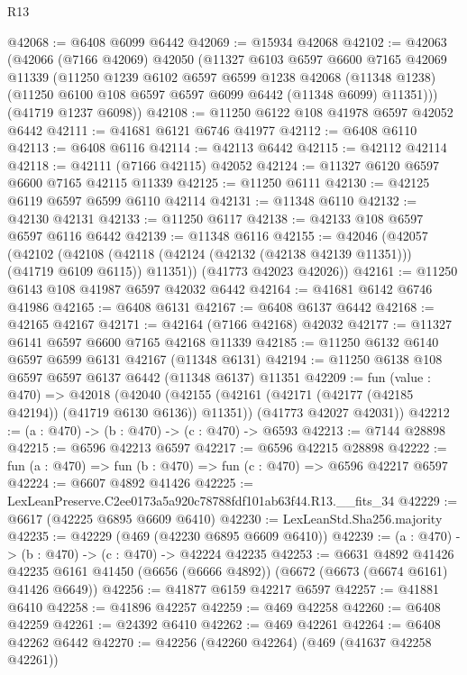 \begin{lexlean}{R13}
\begin{coremodule}
@42068 := @6408 @6099 @6442
@42069 := @15934 @42068
@42102 := @42063
    (@42066
      (@7166 @42069)
      @42050
      (@11327
        @6103
        @6597
        @6600
        @7165
        @42069
        @11339
        (@11250
          @1239
          @6102
          @6597
          @6599
          @1238
          @42068
          (@11348 @1238)
          (@11250 @6100 @108 @6597 @6597 @6099 @6442 (@11348 @6099) @11351)))
      (@41719 @1237 @6098))
@42108 := @11250 @6122 @108 @41978 @6597 @42052 @6442
@42111 := @41681 @6121 @6746 @41977
@42112 := @6408 @6110
@42113 := @6408 @6116
@42114 := @42113 @6442
@42115 := @42112 @42114
@42118 := @42111 (@7166 @42115) @42052
@42124 := @11327 @6120 @6597 @6600 @7165 @42115 @11339
@42125 := @11250 @6111
@42130 := @42125 @6119 @6597 @6599 @6110 @42114
@42131 := @11348 @6110
@42132 := @42130 @42131
@42133 := @11250 @6117
@42138 := @42133 @108 @6597 @6597 @6116 @6442
@42139 := @11348 @6116
@42155 := @42046
    (@42057
      (@42102
        (@42108 (@42118 (@42124 (@42132 (@42138 @42139 @11351))) (@41719 @6109 @6115)) @11351))
      (@41773 @42023 @42026))
@42161 := @11250 @6143 @108 @41987 @6597 @42032 @6442
@42164 := @41681 @6142 @6746 @41986
@42165 := @6408 @6131
@42167 := @6408 @6137 @6442
@42168 := @42165 @42167
@42171 := @42164 (@7166 @42168) @42032
@42177 := @11327 @6141 @6597 @6600 @7165 @42168 @11339
@42185 := @11250 @6132 @6140 @6597 @6599 @6131 @42167 (@11348 @6131)
@42194 := @11250 @6138 @108 @6597 @6597 @6137 @6442 (@11348 @6137) @11351
@42209 := fun (value : @470) =>
  @42018
    (@42040
      (@42155 (@42161 (@42171 (@42177 (@42185 @42194)) (@41719 @6130 @6136)) @11351))
      (@41773 @42027 @42031))
@42212 := (a : @470) -> (b : @470) -> (c : @470) -> @6593
@42213 := @7144 @28898
@42215 := @6596 @42213 @6597
@42217 := @6596 @42215 @28898
@42222 := fun (a : @470) => fun (b : @470) => fun (c : @470) => @6596 @42217 @6597
@42224 := @6607 @4892 @41426
@42225 := LexLeanPreserve.C2ee0173a5a920c78788fdf101ab63f44.R13.__fits_34
@42229 := @6617 (@42225 @6895 @6609 @6410)
@42230 := LexLeanStd.Sha256.majority
@42235 := @42229 (@469 (@42230 @6895 @6609 @6410))
@42239 := (a : @470) -> (b : @470) -> (c : @470) -> @42224 @42235
@42253 := @6631
    @4892
    @41426
    @42235
    @6161
    @41450
    (@6656 (@6666 @4892))
    (@6672 (@6673 (@6674 @6161) @41426 @6649))
@42256 := @41877 @6159 @42217 @6597
@42257 := @41881 @6410
@42258 := @41896 @42257
@42259 := @469 @42258
@42260 := @6408 @42259
@42261 := @24392 @6410
@42262 := @469 @42261
@42264 := @6408 @42262 @6442
@42270 := @42256 (@42260 @42264) (@469 (@41637 @42258 @42261))

\end{coremodule}
\end{lexlean}

